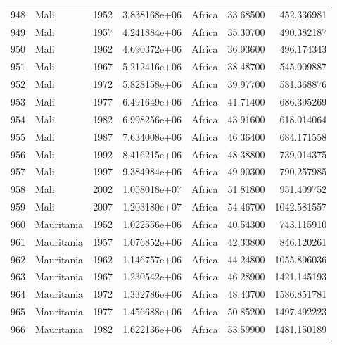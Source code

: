 \documentclass[
  letterpaper,
  DIV=11,
  numbers=noendperiod]{scrreprt}
\begin{document}
\begin{tabular}{llrrlrr}
948  &                      Mali &  1952 &  3.838168e+06 &    Africa &  33.68500 &     452.336981 \\
949  &                      Mali &  1957 &  4.241884e+06 &    Africa &  35.30700 &     490.382187 \\
950  &                      Mali &  1962 &  4.690372e+06 &    Africa &  36.93600 &     496.174343 \\
951  &                      Mali &  1967 &  5.212416e+06 &    Africa &  38.48700 &     545.009887 \\
952  &                      Mali &  1972 &  5.828158e+06 &    Africa &  39.97700 &     581.368876 \\
953  &                      Mali &  1977 &  6.491649e+06 &    Africa &  41.71400 &     686.395269 \\
954  &                      Mali &  1982 &  6.998256e+06 &    Africa &  43.91600 &     618.014064 \\
955  &                      Mali &  1987 &  7.634008e+06 &    Africa &  46.36400 &     684.171558 \\
956  &                      Mali &  1992 &  8.416215e+06 &    Africa &  48.38800 &     739.014375 \\
957  &                      Mali &  1997 &  9.384984e+06 &    Africa &  49.90300 &     790.257985 \\
958  &                      Mali &  2002 &  1.058018e+07 &    Africa &  51.81800 &     951.409752 \\
959  &                      Mali &  2007 &  1.203180e+07 &    Africa &  54.46700 &    1042.581557 \\
960  &                Mauritania &  1952 &  1.022556e+06 &    Africa &  40.54300 &     743.115910 \\
961  &                Mauritania &  1957 &  1.076852e+06 &    Africa &  42.33800 &     846.120261 \\
962  &                Mauritania &  1962 &  1.146757e+06 &    Africa &  44.24800 &    1055.896036 \\
963  &                Mauritania &  1967 &  1.230542e+06 &    Africa &  46.28900 &    1421.145193 \\
964  &                Mauritania &  1972 &  1.332786e+06 &    Africa &  48.43700 &    1586.851781 \\
965  &                Mauritania &  1977 &  1.456688e+06 &    Africa &  50.85200 &    1497.492223 \\
966  &                Mauritania &  1982 &  1.622136e+06 &    Africa &  53.59900 &    1481.150189 \\

\end{tabular}
\end{document}
